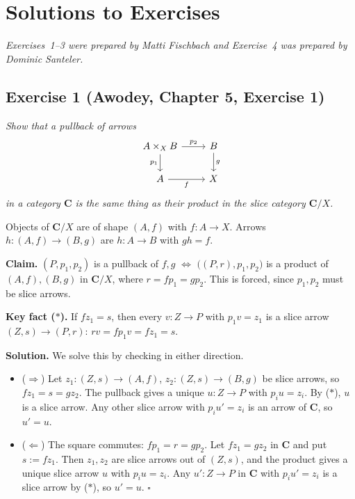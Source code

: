 \section{Solutions to Exercises}
\label{app:exercises}

\noindent\textit{Exercises~1--3 were prepared by Matti Fischbach and Exercise~4 was prepared by Dominic Santeler.}

\subsection{Exercise 1 (Awodey, Chapter 5, Exercise 1)}
\label{ex:1}

\textit{Show that a pullback of arrows}
\[
\begin{tikzcd}
  A \times_{X} B \ar[r, "p_2"] \ar[d, "p_1"'] & B \ar[d, "g"] \\
  A \ar[r, "f"'] & X
\end{tikzcd}
\]
\textit{in a category $\mathbf{C}$ is the same thing as their product in the slice
category $\mathbf{C}/X$.}

\medskip

Objects of $\mathbf{C}/X$ are of shape $(A,f)$ with $f : A \to X$. Arrows
$h : (A,f) \to (B,g)$ are $h : A \to B$ with $g h = f$.

\textbf{Claim.} $(P,p_1,p_2)$ is a pullback of $f, g$ $\Leftrightarrow$
$\bigl((P,r),p_1,p_2\bigr)$ is a product of $(A,f), (B,g)$ in $\mathbf{C}/X$,
where $r = f p_1 = g p_2$. This is forced, since $p_1, p_2$ must be slice
arrows.

\textbf{Key fact ($\ast$).} If $f z_1 = s$, then every $v : Z \to P$ with
$p_1 v = z_1$ is a slice arrow $(Z,s) \to (P,r)$:
$r v = f p_1 v = f z_1 = s$.

\textbf{Solution.} We solve this by checking in either direction.

\begin{itemize}
  \item ($\Rightarrow$)
    Let $z_1 : (Z,s) \to (A,f)$, $z_2 : (Z,s) \to (B,g)$ be slice arrows, so
    $f z_1 = s = g z_2$. The pullback gives a unique $u : Z \to P$ with
    $p_i u = z_i$. By ($\ast$), $u$ is a slice arrow. Any other slice arrow
    with $p_i u' = z_i$ is an arrow of $\mathbf{C}$, so $u' = u$.
  \item ($\Leftarrow$)
    The square commutes: $f p_1 = r = g p_2$. Let $f z_1 = g z_2$ in
    $\mathbf{C}$ and put $s := f z_1$. Then $z_1, z_2$ are slice arrows out of
    $(Z,s)$, and the product gives a unique slice arrow $u$ with $p_i u = z_i$.
    Any $u' : Z \to P$ in $\mathbf{C}$ with $p_i u' = z_i$ is a slice arrow by
    ($\ast$), so $u' = u$. \hfill$\square$
\end{itemize}


